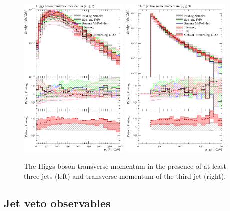 \begin{figure}[t!]
  \centering
  \includegraphics[width=0.47\textwidth]{figures/hjetscomp_H_jjj_pT_incl.pdf}
  \quad
  \includegraphics[width=0.47\textwidth]{figures/hjetscomp_jet3_pT_incl.pdf}
  \caption{
    The Higgs boson transverse momentum in the presence of at least three 
    jets (left) and transverse momentum of the third jet (right).
    \label{fig:higgscomp:results:mobs:hpt_j3pt}
  }
\end{figure}

\subsection{Jet veto observables}
\label{sec:hjetscomp:results:jvobs}

